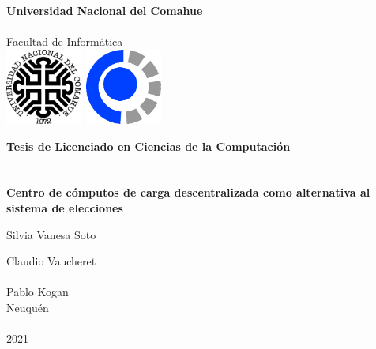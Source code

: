 
\titlepage

\begin{center}
\ \\
\ \\
\vspace{-1cm}
 

\ \\

\vspace{0.5cm}
{\Large{\bf \sc Universidad Nacional del Comahue}}\\

\ \\
{\Large { \sc Facultad de Informática}}\\

\vspace{-2.5cm}
\mbox{\hspace{-1cm}\includegraphics[width=2.5cm,height=2.5cm]{img/unc.png}\hspace{13cm} \includegraphics[width=2.5cm,height=2.5cm]{img/fai.png}}


\vspace{6cm}

{\Large {\bf\sc Tesis de Licenciado en Ciencias de la Computaci\'on}}\\
\ \\
\ \\
{\LARGE {\bf Centro de cómputos de carga descentralizada como alternativa al sistema de elecciones}}\\
\vspace{3cm}


{\Large Silvia Vanesa Soto}\\
\vspace{2cm}

{\Large Claudio Vaucheret}\\
\ \\
{\Large Pablo Kogan}\\

\vfill
{\Large {\sc Neuqu\'en}\hspace{6cm}{\sc Argentina}}\\
\ \\

{\Large 2021}\\

\end{center}

\pagebreak


